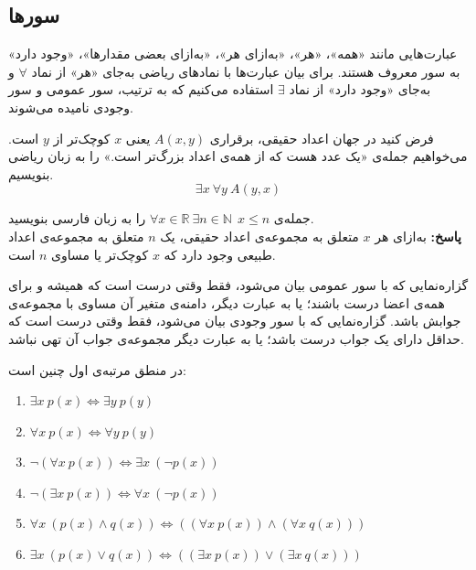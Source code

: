 \subsection{سورها}
عبارت‌هایی مانند «همه»، «هر»، «به‌ازای هر»، «به‌ازای بعضی مقدارها»، «وجود دارد» به سور معروف هستند. برای بیان عبارت‌ها با نمادهای ریاضی به‌جای «هر» از نماد
$\forall$
و به‌جای «وجود دارد» از نماد
$\exists$
استفاده می‌کنیم که به ترتیب، سور عمومی و سور وجودی نامیده می‌شوند.
\begin{example}
	فرض کنید در جهان اعداد حقیقی، برقراری
	$A(x,y)$
	یعنی $x$ کوچک‌تر از $y$ است. می‌خواهیم جمله‌ی «یک عدد هست که از همه‌ی اعداد بزرگ‌تر است.» را به زبان ریاضی بنویسیم.
	$$\exists x \ \forall y \ A(y,x)$$
\end{example}
\begin{example}
	جمله‌ی
	$\forall x \in \mathbb{R} \ \exists n \in \mathbb{N} \ \ x \leq n$
	را به زبان فارسی بنویسید.
	\\ \textbf{پاسخ:}
	به‌ازای هر $x$ متعلق به مجموعه‌ی اعداد حقیقی، یک $n$ متعلق به مجموعه‌ی اعداد طبیعی وجود دارد که $x$ کوچک‌تر یا مساوی $n$ است.
\end{example}
\smallskip
گزاره‌نمایی که با سور عمومی بیان می‌شود، فقط وقتی درست است که همیشه و برای همه‌ی اعضا درست باشند؛ یا به عبارت دیگر، دامنه‌ی متغیر آن مساوی با مجموعه‌ی جوابش باشد. گزاره‌نمایی که با سور وجودی بیان می‌شود، فقط وقتی درست است که حداقل دارای یک جواب درست باشد؛ یا به عبارت دیگر مجموعه‌ی جواب آن تهی نباشد.
\begin{theorem}
	در منطق مرتبه‌ی اول چنین است:
	\begin{enumerate}
		\item 
		$\exists x \ p(x) \iff \exists y \ p(y)$
		\item 
		$\forall x \ p(x) \iff \forall y \ p(y)$
		\item 
		$\neg(\forall x \ p(x)) \iff \exists x \ (\neg p(x))$
		\item 
		$\neg (\exists x \ p(x)) \iff \forall x \ (\neg p(x))$
		\item 
		$\forall x \ (p(x) \wedge q(x)) \iff ((\forall x \ p(x)) \wedge (\forall x \ q(x)))$
		\item 
		$\exists x \ (p(x) \vee q(x)) \iff ((\exists x \ p(x)) \vee (\exists x \ q(x)))$
	\end{enumerate}
\end{theorem}
